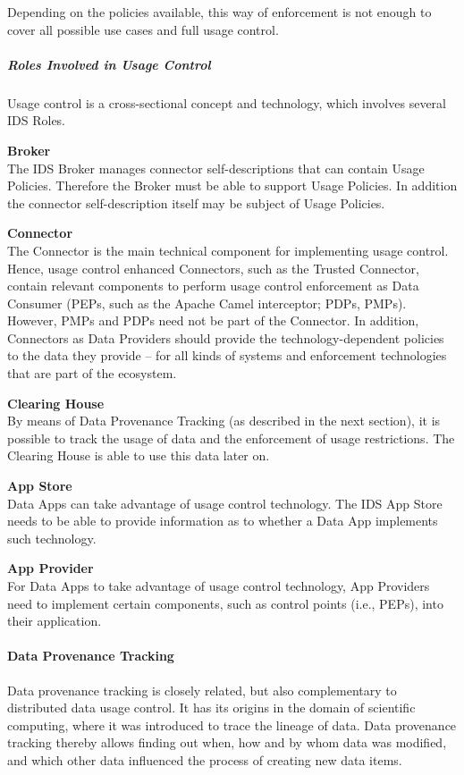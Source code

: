 

Depending on the policies available, this way of enforcement is not enough to cover all possible use cases and full usage control. 

\subparagraph*{Roles Involved in Usage Control\\}
Usage control is a cross-sectional concept and technology, which involves several IDS Roles.

\textbf{Broker}\\
The IDS Broker manages connector self-descriptions that can contain Usage Policies. Therefore the Broker must be able to support Usage Policies. In addition the connector self-description itself may be subject of Usage Policies. 

\textbf{Connector}\\
The Connector is the main technical component for implementing usage control. Hence, usage control enhanced Connectors, such as the Trusted Connector, contain relevant components to perform usage control enforcement as Data Consumer (PEPs, such as the Apache Camel interceptor; PDPs, PMPs). However, PMPs and PDPs need not be part of the Connector. In addition, Connectors as Data Providers should provide the technology-dependent policies to the data they provide – for all kinds of systems and enforcement technologies that are part of the ecosystem.

\textbf{Clearing House}\\
By means of Data Provenance Tracking (as described in the next section), it is possible to track the usage of data and the enforcement of usage restrictions. The Clearing House is able to use this data later on.

\textbf{App Store}\\
Data Apps can take advantage of usage control technology. The IDS App Store needs to be able to provide information as to whether a Data App implements such technology.

\textbf{App Provider}\\
For Data Apps to take advantage of usage control technology, App Providers need to implement certain components, such as control points (i.e., PEPs), into their application.


\paragraph*{Data Provenance Tracking\\}
Data provenance tracking is closely related, but also complementary to distributed data usage control. It has its origins in the domain of scientific computing, where it was introduced to trace the lineage of data. Data provenance tracking thereby allows finding out when, how and by whom data was modified, and which other data influenced the process of creating new data items.

